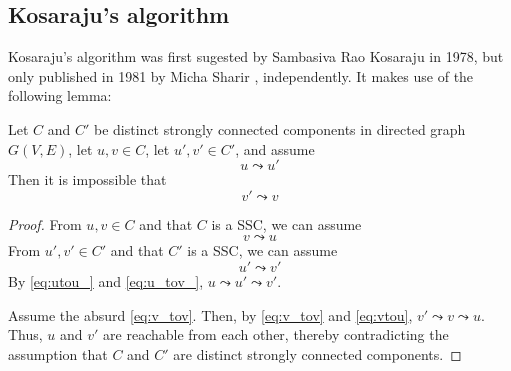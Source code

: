 \subsection{Kosaraju's algorithm} \label{algorithm-scc-kosaraju}
Kosaraju's algorithm was first sugested by Sambasiva Rao Kosaraju in 1978, but only published in 1981 by Micha Sharir \cite{sharir81}, independently. It makes use of the following lemma:
\begin{lemma} \label{lem:kosaraju1}
    Let $C$ and $C'$ be distinct strongly connected components in directed graph $G(V,E)$, let $u,v \in C$, let $u',v' \in C'$, and assume
    \begin{equation}
        \label{eq:utou_} u \leadsto u'
    \end{equation}
    Then it is impossible that
    \begin{equation}
        \label{eq:v_tov} v' \leadsto v
    \end{equation}
\end{lemma}
\begin{proof} From $u, v \in C$ and that $C$ is a SSC, we can assume
    \begin{equation}
        \label{eq:vtou} v \leadsto u
    \end{equation}
    From $u', v' \in C'$ and that $C'$ is a SSC, we can assume
    \begin{equation}
        \label{eq:u_tov_} u' \leadsto v'
    \end{equation}
    By \eqref{eq:utou_} and \eqref{eq:u_tov_}, $u \leadsto u' \leadsto v'$.\par
    Assume the absurd \eqref{eq:v_tov}. Then, by \eqref{eq:v_tov} and \eqref{eq:vtou}, $v' \leadsto v \leadsto u$. Thus, $u$ and $v'$ are reachable from each other, thereby contradicting the assumption that $C$ and $C'$ are distinct strongly connected components.
\end{proof}
